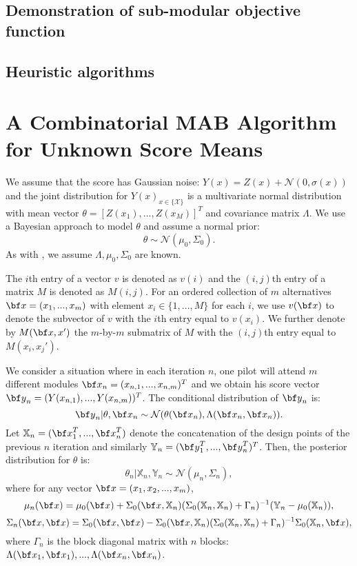 \documentclass[opre,sglanonrev]{informs4}
\begin{document}

\subsection{Demonstration of sub-modular objective function}
\label{submodular}

\subsection{Heuristic algorithms}
\label{heuristic}

\section{A Combinatorial MAB Algorithm for Unknown Score Means}
\label{unknown means}
We assume that the score has Gaussian noise: $Y(x) = Z(x) + \mathcal{N}(0,\sigma(x))$ and the joint distribution for $Y(x)_{x\in\{\mathcal{X}\}}$ is a multivariate normal distribution with mean vector $\theta = [Z(x_1),...,Z(x_M)]^T$ and covariance matrix $\Lambda$. We use a Bayesian approach to model $\theta$ and assume a normal prior:
$$\theta \sim \mathcal{N}(\mu_0, \Sigma_0). $$
As with \cite{xie2016bayesian}, we assume $\Lambda, \mu_0, \Sigma_0$ are known.

The $i$th entry of a vector $v$ is denoted as $v(i)$ and the $(i,j)$th entry of a matrix $M$ is denoted as $M(i,j)$. For an ordered collection of $m$ alternatives ${\bf x}=(x_1,...,x_m)$ with element $x_i \in \{1,...,M\}$ for each $i$, we use $v(\bf x)$ to denote the subvector of $v$ with the $i$th entry equal to $v(x_i)$. We further denote by $M(\bf x, x')$ the $m$-by-$m$ submatrix of $M$ with the $(i,j)$th entry equal to $M(x_i, x_j')$.  

We consider a situation where in each iteration $n$, one pilot will attend $m$ different modules ${\bf x}_n = (x_{n,1},...,x_{n,m})^T$ and we obtain his score vector ${\bf y}_n = (Y(x_{n,1}),...,Y(x_{n,m}))^T$. The conditional distribution of ${\bf y}_n$ is:
$${\bf y}_n | \theta,{\bf x}_n \sim \mathcal{N}(\theta({\bf x}_n), \Lambda({\bf x}_n,{\bf x}_n)). $$ 
Let $\mathbb{X}_n = ({\bf x}_1^T,...,{\bf x}_n^T )$ denote the concatenation of the design points of the previous $n$ iteration and similarly $\mathbb{Y}_n =({\bf y}_1^T,...,{\bf y}_n^T )^T$. Then, the posterior distribution for $\theta$ is:
$$\theta_n|\mathbb{X}_n,\mathbb{Y}_n  \sim \mathcal{N}(\mu_n, \Sigma_n),$$
where for any vector ${\bf x} = (x_1, x_2,...,x_m)$,
$$
	\mu_n({\bf x}) = \mu_0({\bf x}) + \Sigma_0(\bf x, \mathbb{X}_n)(\Sigma_0(\mathbb{X}_n,\mathbb{X}_n) + \Gamma_n)^{-1}(\mathbb{Y}_n-\mu_0(\mathbb{X}_n)),
$$
$$
	\Sigma_n({\bf x},{\bf x}) = \Sigma_0({\bf x},{\bf x}) - \Sigma_0(\bf x, \mathbb{X}_n)(\Sigma_0(\mathbb{X}_n,\mathbb{X}_n) + \Gamma_n)^{-1}\Sigma_0(\mathbb{X}_n, \bf x),
$$
where $\Gamma_n$ is the block diagonal matrix with $n$ blocks: $\Lambda({\bf x}_1, {\bf x}_1),...,\Lambda({\bf x}_n, {\bf x}_n)$.
\end{document}
